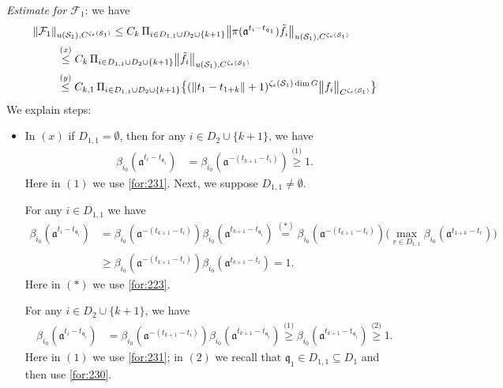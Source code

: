 \documentclass[11 pt]{amsart}
\newcommand{\norm}[1]{\lVert#1\rVert}
\theoremstyle{definition}
\numberwithin{equation}{section}
\begin{document}
\emph{Estimate for $\mathcal{F}_1$}: we have
\begin{align}\label{for:233}
 \norm{\mathcal{F}_1}&_{u(\mathcal{S}_1),C^{\zeta_\epsilon(\mathcal{S}_1)}}\leq C_k\,\Pi_{i\in D_{1,1}\cup D_2\cup \{k+1\}}\big\| \pi(\mathfrak{a}^{t_i-t_{ \mathfrak{q}_1}})\tilde{f}_i\big\|_{u(\mathcal{S}_1),C^{\zeta_\epsilon(\mathcal{S}_1)}}\notag\\
 &\overset{(x)}{\leq} C_k\,\Pi_{i\in D_{1,1}\cup D_2\cup \{k+1\}}\big\| \tilde{f}_i\big\|_{u(\mathcal{S}_1),C^{\zeta_\epsilon(\mathcal{S}_1)}}\notag\\
 &\overset{(y)}{\leq} C_{k,1}\, \Pi_{i\in D_{1,1}\cup D_2\cup \{k+1\}}\big\{(\|t_1-t_{1+k}\|+1)^{\zeta_\epsilon(\mathcal{S}_1)\dim G }\big\| f_i\big\|_{C^{\zeta_\epsilon(\mathcal{S}_1)}}\big\}
\end{align}
We explain steps:
\begin{itemize}
  \item In $(x)$ if $D_{1,1}=\emptyset$, then for any $i\in D_2\cup \{k+1\}$, we have
  \begin{align*}
   \beta_{i_0}(\mathfrak{a}^{t_{i}-t_{ \mathfrak{q}_1}})&=\beta_{i_0}(\mathfrak{a}^{-(t_{k+1}-t_{i})})\overset{\text{(1)}}{\geq}1.
 \end{align*}
  Here in $(1)$ we use  \eqref{for:231}. Next, we suppose $D_{1,1}\neq\emptyset$.

  For any $i\in D_{1,1}$ we have
  \begin{align*}
   \beta_{i_0}(\mathfrak{a}^{t_{i}-t_{ \mathfrak{q}_1}})&=\beta_{i_0}(\mathfrak{a}^{-(t_{k+1}-t_{i})})\beta_{i_0}(\mathfrak{a}^{t_{k+1}-t_{ \mathfrak{q}_1}})\overset{(*)}{=}\beta_{i_0}(\mathfrak{a}^{-(t_{k+1}-t_{i})})\big( \max_{r\in D_{1,1}} \beta_{i_0}(\mathfrak{a}^{t_{1+k}-t_{r}})\big)\\
   &\geq \beta_{i_0}(\mathfrak{a}^{-(t_{k+1}-t_{i})})\beta_{i_0}(\mathfrak{a}^{t_{k+1}-t_{ i}})=1.
 \end{align*}
  Here in $(*)$ we use \eqref{for:223}.

  For any $i\in D_2\cup \{k+1\}$, we have
  \begin{align*}
   \beta_{i_0}(\mathfrak{a}^{t_{i}-t_{ \mathfrak{q}_1}})&=\beta_{i_0}(\mathfrak{a}^{-(t_{k+1}-t_{i})})\beta_{i_0}(\mathfrak{a}^{t_{k+1}-t_{ \mathfrak{q}_1}})\overset{\text{(1)}}{\geq} \beta_{i_0}(\mathfrak{a}^{t_{k+1}-t_{\mathfrak{q}_1}})\overset{\text{(2)}}{\geq} 1.
 \end{align*}
  Here in $(1)$ we use  \eqref{for:231}; in $(2)$ we recall that $\mathfrak{q}_1 \in D_{1,1}\subseteq D_1$ and then use \eqref{for:230}.


\end{itemize}
\end{document}
